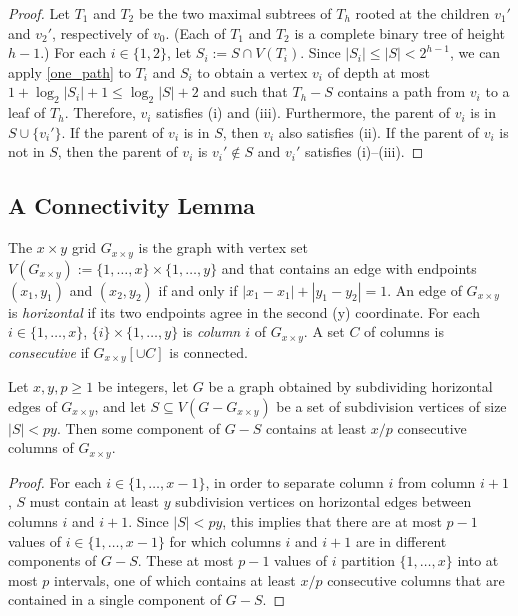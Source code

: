 \documentclass{patmorin}
\newcommand{\defin}[1]{\emph{\color{brightmaroon}#1}}
\renewcommand{\le}{\leqslant}
\renewcommand{\ge}{\geqslant}
\begin{document}
\begin{proof}
  Let $T_1$ and $T_2$ be the two maximal subtrees of $T_h$ rooted at the children $v_1'$ and $v_2'$, respectively of $v_0$. (Each of $T_1$ and $T_2$ is a complete binary tree of height $h-1$.)  For each $i\in\{1,2\}$, let $S_i:=S\cap V(T_i)$.  Since $|S_i|\le |S|< 2^{h-1}$, we can apply \cref{one_path} to $T_i$ and $S_i$ to obtain a vertex $v_i$ of depth at most $1+\log_2|S_i|+1 \le \log_2 |S| + 2$ and such that $T_h-S$ contains a path from $v_i$ to a leaf of $T_h$.  Therefore, $v_i$ satisfies (i) and (iii).  Furthermore, the parent of $v_i$ is in $S\cup\{v_i'\}$.  If the parent of $v_i$ is in $S$, then $v_i$ also satisfies (ii).  If the parent of $v_i$ is not in $S$, then the parent of $v_i$ is $v_i'\not\in S$ and $v_i'$ satisfies (i)--(iii).
\end{proof}

\subsection{A Connectivity Lemma}

The $x\times y$ grid $G_{x\times y}$ is the graph with vertex set $V(G_{x\times y}):=\{1,\ldots,x\}\times\{1,\ldots,y\}$ and that contains an edge with endpoints $(x_1,y_1)$ and $(x_2,y_2)$ if and only if $|x_1-x_1|+|y_1-y_2|=1$.  An edge of $G_{x\times y}$ is \defin{horizontal} if its two endpoints agree in the second (y) coordinate.  For each $i\in\{1,\ldots,x\}$, $\{i\}\times\{1,\ldots,y\}$ is \defin{column $i$} of $G_{x\times y}$.  A set $C$ of columns is \defin{consecutive} if $G_{x\times y}[\cup C]$ is connected. 


\begin{lem}\label{grid_connectivity}
  Let $x,y,p\ge 1$ be integers, let $G$ be a graph obtained by subdividing horizontal edges of $G_{x\times y}$, and let $S\subseteq V(G-G_{x\times y})$ be a set of subdivision vertices of size $|S|< py$.  Then some component of $G-S$ contains at least $x/p$ consecutive columns of $G_{x\times y}$.
\end{lem}

\begin{proof}
  For each $i\in\{1,\ldots,x-1\}$, in order to separate column $i$ from column $i+1$, $S$ must contain at least $y$ subdivision vertices on horizontal edges between columns $i$ and $i+1$.  Since $|S|< py$, this implies that there are at most $p-1$ values of $i\in\{1,\ldots,x-1\}$ for which columns $i$ and $i+1$ are in different components of $G-S$. These at most $p-1$ values of $i$ partition $\{1,\ldots,x\}$ into at most $p$ intervals, one of which contains at least $x/p$ consecutive columns that are contained in a single component of $G-S$.
\end{proof}
\end{document}
